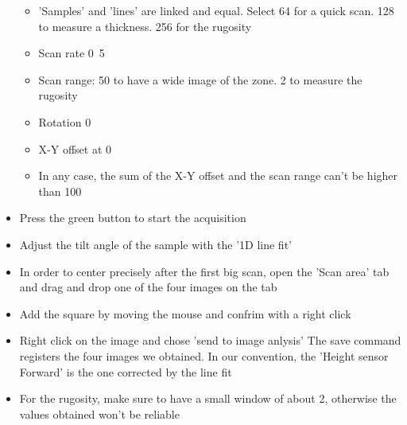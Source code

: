 \documentclass[a4paper]{article}
\begin{document}
\begin{itemize}
          \begin{itemize}
              \item 'Samples' and 'lines' are linked and equal. Select 64 for a quick scan. 128 to measure a thickness. 256 for the rugosity
              \item Scan rate \unit{0.5}{\hertz}
              \item Scan range: \unit{50}{\micro\meter} to have a wide image of the zone. \unit{2}{\micro\meter} to measure the rugosity
              \item Rotation \unit{0}{\celsius}
              \item X-Y offset at 0
              \item In any case, the sum of the X-Y offset and the scan range can't be higher than \unit{100}{\micro\meter}
          \end{itemize}
\item Press the green button to start the acquisition
\item Adjust the tilt angle of the sample with the '1D line fit'
\item In order to center precisely after the first big scan, open the 'Scan area' tab and drag and drop one of the four images on the tab
\item Add the square by moving the mouse and confrim with a right click
\item Right click on the image and chose 'send to image anlysis'
The save command registers the four images we obtained. In our convention, the 'Height sensor Forward' is the one corrected by the line fit
\item For the rugosity, make sure to have a small window of about \unit{2}{\micro\meter}, otherwise the values obtained won't be reliable
\end{itemize}
\end{document}
